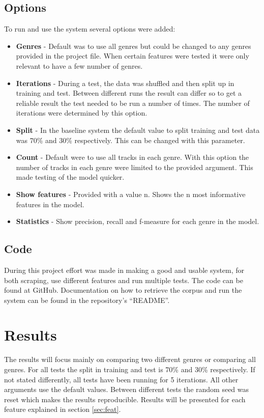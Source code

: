 \documentclass[a4paper, 12pt]{article}
\begin{document}
\subsection{Options}
To run and use the system several options were added:

\begin{itemize}
    \item {\textbf{Genres} - Default was to use all genres but could be changed to any genres provided in the project file.
    When certain features were tested it were only relevant to have a few number of genres.}
    \item {\textbf{Iterations} - During a test, the data was shuffled and then split up in training and test.
    Between different runs the result can differ so to get a reliable result the test needed to be run a number of times.
    The number of iterations were determined by this option.}
    \item {\textbf{Split} - In the baseline system the default value to split training and test data was 70\% and 30\% respectively.
    This can be changed with this parameter.}
    \item {\textbf{Count} - Default were to use all tracks in each genre.
    With this option the number of tracks in each genre were limited to the provided argument.
    This made testing of the model quicker.}
    \item {\textbf{Show features} - Provided with a value n. Shows the n most informative features in the model.}
    \item {\textbf{Statistics} - Show precision, recall and f-measure for each genre in the model.}
\end{itemize}

\subsection{Code}
During this project effort was made in making a good and usable system, for both scraping, use different features and run multiple tests.
The code can be found at GitHub. \cite{github}
Documentation on how to retrieve the corpus and run the system can be found in the repository's ``README''.

\section{Results}
The results will focus mainly on comparing two different genres or comparing all genres.
For all tests the split in training and test is 70\% and 30\% respectively.
If not stated differently, all tests have been running for 5 iterations.
All other arguments use the default values.
Between different tests the random seed was reset which makes the results reproducible.
Results will be presented for each feature explained in section \ref{sec:feat}.
\end{document}
